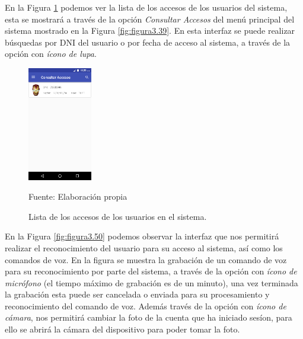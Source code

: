 \vskip -0.5cm
En la Figura \ref{fig:figura3.47} podemos ver la lista de los accesos de los usuarios del sistema, esta se mostrará a través de la opción \textit{Consultar Accesos} del menú principal del sistema mostrado en la Figura \ref{fig:figura3.39}. En esta interfaz se puede realizar búsquedas por DNI del usuario o por fecha de acceso al sistema, a través de la opción con \textit{ícono de lupa}.
\begin{figure}[H]
\captionsetup{justification=centering}
\begin{center}
\includegraphics[width=0.25\textwidth]{Imagenes/Cap3/image047}
\end{center}
\begin{center}
\vskip -0.5cm
\caption{\small{Lista de los accesos de los usuarios en el sistema.}}
\label{fig:figura3.47}
{\small{Fuente: Elaboración propia}}
\end{center}
\end{figure}
\vskip -0.5cm
En la Figura \ref{fig:figura3.50} podemos observar la interfaz que nos permitirá realizar el reconocimiento del usuario para su acceso al sistema, así como los comandos de voz. En la figura se muestra la grabación de un comando de voz para su reconocimiento por parte del sistema, a través de la opción con \textit{ícono de micrófono} (el tiempo máximo de grabación es de un minuto), una vez terminada la grabación esta puede ser cancelada o enviada para su procesamiento y reconocimiento del comando de voz. Además través de la opción con \textit{ícono de cámara}, nos permitirá cambiar la foto de la cuenta que ha iniciado sesíon, para ello se abrirá la cámara del dispositivo para poder tomar la foto.

